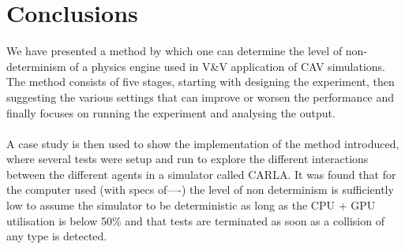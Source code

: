 \section{Conclusions}
\noindent We have presented a method by which one can determine the level of non-determinism of a physics engine used in V\&V application of CAV simulations. The method consists of five stages, starting with designing the experiment, then suggesting the various settings that can improve or worsen the performance and finally focuses on running the experiment and analysing the output. \\\\
A case study is then used to show the implementation of the method introduced, where several tests were setup and run to explore the different interactions between the different agents in a simulator called CARLA. It was found that for the computer used (with specs of----) the level of non determinism is sufficiently low to assume the simulator to be deterministic as long as the CPU + GPU utilisation is below 50\% and that tests are terminated as soon as a collision of any type is detected. %


